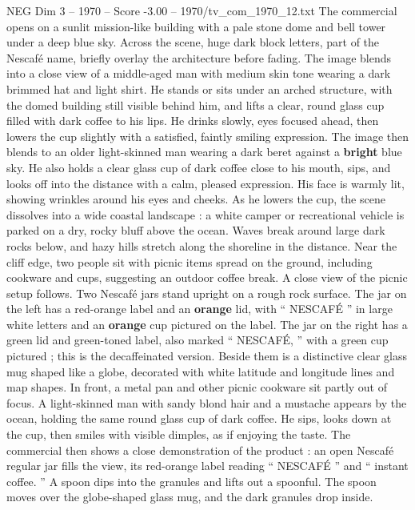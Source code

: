 \begin{textsample}{NEG Dim 3 – 1970 – Score -3.00 – 1970/tv\_com\_1970\_12.txt}  \label{ex:f3_neg_063}
The commercial opens on a sunlit mission-like building with a pale stone dome and bell tower under a deep blue sky.
Across the scene, huge dark block letters, part of the Nescafé name, briefly overlay the architecture before fading.
The image blends into a close view of a middle-aged man with medium skin tone wearing a dark brimmed hat and light shirt.
He stands or sits under an arched structure, with the domed building still visible behind him, and lifts a clear, round glass cup filled with dark coffee to his lips.
He drinks slowly, eyes focused ahead, then lowers the cup slightly with a satisfied, faintly smiling expression.
The image then blends to an older light-skinned man wearing a dark beret against a \textbf{bright} blue sky.
He also holds a clear glass cup of dark coffee close to his mouth, sips, and looks off into the distance with a calm, pleased expression.
His face is warmly lit, showing wrinkles around his eyes and cheeks.
As he lowers the cup, the scene dissolves into a wide coastal landscape : a white camper or recreational vehicle is parked on a dry, rocky bluff above the ocean.
Waves break around large dark rocks below, and hazy hills stretch along the shoreline in the distance.
Near the cliff edge, two people sit with picnic items spread on the ground, including cookware and cups, suggesting an outdoor coffee break.
A close view of the picnic setup follows.
Two Nescafé jars stand upright on a rough rock surface.
The jar on the left has a red-orange label and an \textbf{orange} lid, with “ NESCAFÉ ” in large white letters and an \textbf{orange} cup pictured on the label.
The jar on the right has a green lid and green-toned label, also marked “ NESCAFÉ, ” with a green cup pictured ; this is the decaffeinated version.
Beside them is a distinctive clear glass mug shaped like a globe, decorated with white latitude and longitude lines and map shapes.
In front, a metal pan and other picnic cookware sit partly out of focus.
A light-skinned man with sandy blond hair and a mustache appears by the ocean, holding the same round glass cup of dark coffee.
He sips, looks down at the cup, then smiles with visible dimples, as if enjoying the taste.
The commercial then shows a close demonstration of the product : an open Nescafé regular jar fills the view, its red-orange label reading “ NESCAFÉ ” and “ instant coffee. ” A spoon dips into the granules and lifts out a spoonful.
The spoon moves over the globe-shaped glass mug, and the dark granules drop inside.

\end{textsample}
